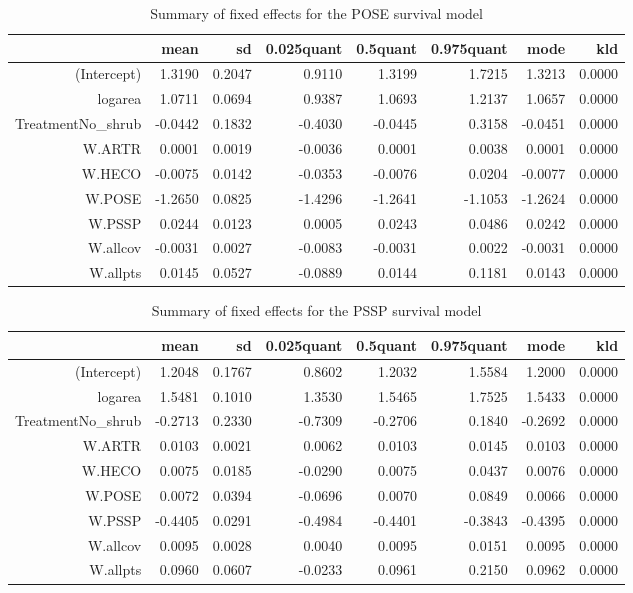 \begin{table}[ht]
\centering
\caption{Summary of fixed effects for the POSE survival model} 
\label{POSEsurvival}
\begin{tabular}{rrrrrrrr}
  \hline
 & mean & sd & 0.025quant & 0.5quant & 0.975quant & mode & kld \\ 
  \hline
(Intercept) & 1.3190 & 0.2047 & 0.9110 & 1.3199 & 1.7215 & 1.3213 & 0.0000 \\ 
  logarea & 1.0711 & 0.0694 & 0.9387 & 1.0693 & 1.2137 & 1.0657 & 0.0000 \\ 
  TreatmentNo\_shrub & -0.0442 & 0.1832 & -0.4030 & -0.0445 & 0.3158 & -0.0451 & 0.0000 \\ 
  W.ARTR & 0.0001 & 0.0019 & -0.0036 & 0.0001 & 0.0038 & 0.0001 & 0.0000 \\ 
  W.HECO & -0.0075 & 0.0142 & -0.0353 & -0.0076 & 0.0204 & -0.0077 & 0.0000 \\ 
  W.POSE & -1.2650 & 0.0825 & -1.4296 & -1.2641 & -1.1053 & -1.2624 & 0.0000 \\ 
  W.PSSP & 0.0244 & 0.0123 & 0.0005 & 0.0243 & 0.0486 & 0.0242 & 0.0000 \\ 
  W.allcov & -0.0031 & 0.0027 & -0.0083 & -0.0031 & 0.0022 & -0.0031 & 0.0000 \\ 
  W.allpts & 0.0145 & 0.0527 & -0.0889 & 0.0144 & 0.1181 & 0.0143 & 0.0000 \\ 
   \hline
\end{tabular}
\end{table}

\begin{table}[ht]
\centering
\caption{Summary of fixed effects for the PSSP survival model} 
\label{PSSPsurvival}
\begin{tabular}{rrrrrrrr}
  \hline
 & mean & sd & 0.025quant & 0.5quant & 0.975quant & mode & kld \\ 
  \hline
(Intercept) & 1.2048 & 0.1767 & 0.8602 & 1.2032 & 1.5584 & 1.2000 & 0.0000 \\ 
  logarea & 1.5481 & 0.1010 & 1.3530 & 1.5465 & 1.7525 & 1.5433 & 0.0000 \\ 
  TreatmentNo\_shrub & -0.2713 & 0.2330 & -0.7309 & -0.2706 & 0.1840 & -0.2692 & 0.0000 \\ 
  W.ARTR & 0.0103 & 0.0021 & 0.0062 & 0.0103 & 0.0145 & 0.0103 & 0.0000 \\ 
  W.HECO & 0.0075 & 0.0185 & -0.0290 & 0.0075 & 0.0437 & 0.0076 & 0.0000 \\ 
  W.POSE & 0.0072 & 0.0394 & -0.0696 & 0.0070 & 0.0849 & 0.0066 & 0.0000 \\ 
  W.PSSP & -0.4405 & 0.0291 & -0.4984 & -0.4401 & -0.3843 & -0.4395 & 0.0000 \\ 
  W.allcov & 0.0095 & 0.0028 & 0.0040 & 0.0095 & 0.0151 & 0.0095 & 0.0000 \\ 
  W.allpts & 0.0960 & 0.0607 & -0.0233 & 0.0961 & 0.2150 & 0.0962 & 0.0000 \\ 
   \hline
\end{tabular}
\end{table}

